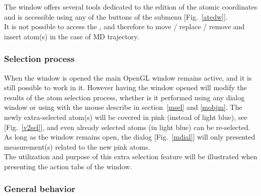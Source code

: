 The  window offers several tools dedicated to the edition of the atomic coordinates 
and is accessible using any of the buttons of the  submenu [Fig.~\ref{atedw}]. \\
\laf It is not possible to access the , and therefore to move / replace / remove and insert atom(s) 
in the case of MD trajectory. 

\subsubsection*{Selection process}
\label{newsel}

When the  window is opened the main OpenGL window remains active, and it is still possible to work in it. 
However having the  window opened will modify the results of the atom selection process, 
whether is it performed using any dialog window or using with the mouse describe in section~\ref{msel} and \ref{mobjm}. 
The newly extra-selected atom(s) will be covered in pink (instead of light blue), see [Fig.~\ref{v2sel}], 
and even already selected atoms (in light blue) can be re-selected. 
\eselfig
\laf As long as the  window remains open, the  dialog [Fig.~\ref{mdial}] will only presented measurement(s) related to the new pink atoms. \\
The utilization and purpose of this extra selection feature will be illustrated when presenting the action tabs of the  window. 

\subsubsection*{General behavior}

